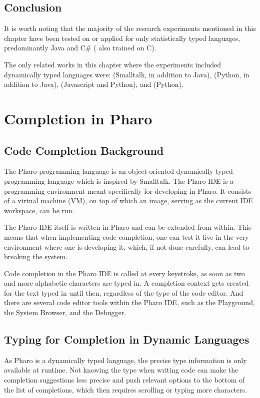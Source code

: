 \documentclass[sigplan,screen]{acmart}
\begin{document}
\subsection{Conclusion}
It is worth noting that the majority of the research experiments mentioned in this chapter have been tested on or applied for only statistically typed languages, predominantly Java and C\# (\cite{Hind12a} also trained on C).

The only related works in this chapter where the experiments included dynamically typed languages were: \cite{Robb08a} (Smalltalk, in addition to Java), \cite{Tu14a} (Python, in addition to Java), \cite{Li17a} (Javascript and Python), and \cite{Svya19a} (Python).

\section{Completion in Pharo}
\subsection{Code Completion Background}
The Pharo programming language is an object-oriented dynamically typed programming language which is inspired by Smalltalk. The Pharo IDE is a programming environment meant specifically for developing in Pharo. It consists of a virtual machine (VM), on top of which an image, serving as the current IDE workspace, can be run.

The Pharo IDE itself is written in Pharo and can be extended from within. This means that when implementing code completion, one can test it live in the very environment where one is developing it, which, if not done carefully, can lead to breaking the system.

Code completion in the Pharo IDE is called at every keystroke, as soon as two and more alphabetic characters are typed in. A completion context gets created for the text typed in until then, regardless of the type of the code editor. And there are several code editor tools within the Pharo IDE, such as the Playground, the System Browser, and the Debugger.

\subsection{Typing for Completion in Dynamic Languages}
As Pharo is a dynamically typed language, the precise type information is only available at runtime. Not knowing the type when writing code can make the completion suggestions less precise and push relevant options to the bottom of the list of completions, which then requires scrolling or typing more characters.
\end{document}
